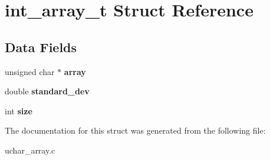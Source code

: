 \hypertarget{structint__array__t}{}\section{int\+\_\+array\+\_\+t Struct Reference}
\label{structint__array__t}
\subsection*{Data Fields}
\begin{DoxyCompactItemize}
\item 
unsigned char $\ast$ {\bfseries array}\hypertarget{structint__array__t_a048ff046ea5ae320db660807eaaea7c8}{}\label{structint__array__t_a048ff046ea5ae320db660807eaaea7c8}

\item 
double {\bfseries standard\+\_\+dev}\hypertarget{structint__array__t_a83c1019d8e6529662fb3b53522f53768}{}\label{structint__array__t_a83c1019d8e6529662fb3b53522f53768}

\item 
int {\bfseries size}\hypertarget{structint__array__t_a13eef7da87a5721c0369e6f68812ae61}{}\label{structint__array__t_a13eef7da87a5721c0369e6f68812ae61}

\end{DoxyCompactItemize}


The documentation for this struct was generated from the following file\+:\begin{DoxyCompactItemize}
\item 
uchar\+\_\+array.\+c\end{DoxyCompactItemize}
